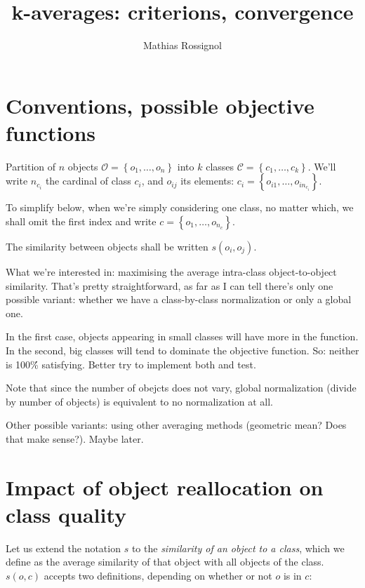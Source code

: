 \documentclass[a4paper,twoside]{article}
\begin{document}
\title{k-averages: criterions, convergence}

\author{Mathias Rossignol}

\maketitle

\section{Conventions, possible objective functions}

Partition of $n$ objects $\mathcal{O} = \left\{o_1, \ldots,
o_n\right\}$ into $k$ classes $\mathcal{C} = \left\{c_1, \ldots,
c_k\right\}$. We'll write $n_{c_i}$ the cardinal of class $c_i$, and
$o_{ij}$ its elements: $c_i = \left\{o_{i1}, \ldots, o_{in_{c_i}}\right\}$.

To simplify below, when we're simply considering one class, no matter
which, we shall omit the first index and write $c = \left\{o_1,
\ldots, o_{n_c}\right\}$.

The similarity between objects shall be written $s\left(o_i, o_j\right)$.

What we're interested in: maximising the average intra-class
object-to-object similarity. That's pretty straightforward, as far as
I can tell there's only one possible variant: whether we have a
class-by-class normalization or only a global one.

In the first case, objects appearing in small classes will have more
 in the function. In the second, big classes will tend to
dominate the objective function. So: neither is 100\'\%
satisfying. Better try to implement both and test.

Note that since the number of obejcts does not vary, global
normalization (divide by number of objects) is equivalent to no
normalization at all.

Other possible variants: using other averaging methods (geometric
mean? Does that make sense?). Maybe later.

\section{Impact of object reallocation on class quality}

Let us extend the notation $s$ to the \emph{similarity of an object to a
  class}, which we define as the average similarity of that object
with all objects of the class. $s(o,c)$ accepts two definitions,
depending on whether or not $o$ is in $c$:
\end{document}
